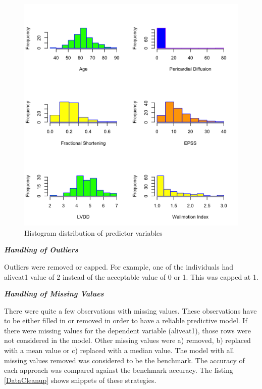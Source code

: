 \documentclass[11pt]{article}
\begin{document}
\begin{figure}[htbp]
\centering
\includegraphics[scale=0.75]{Histogram.png}
\caption{Histogram distribution of predictor variables}
\label{fig:Histogram}
\end{figure}


{\textbf {\emph{Handling of Outliers}}}

Outliers were removed or capped. For example, one of the individuals had aliveat1 value of 2 instead of the acceptable value of 0 or 1. This was capped at 1. 

{\textbf {\emph{Handling of Missing Values}}}

There were quite a few observations with missing values. These observations have to be either filled in or removed in order to have a reliable predictive model. If there were missing values for the dependent variable (aliveat1), those rows were not considered in the model. Other missing values were a) removed, b) replaced with a mean value or c) replaced with a median value. The model with all missing values removed was considered to be the benchmark. The accuracy of each approach was compared against the benchmark accuracy. The listing \ref{DataCleanup} shows snippets of these strategies.
\end{document}
